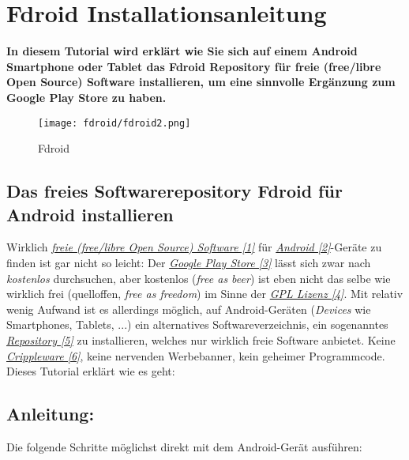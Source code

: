 \section*{Fdroid Installationsanleitung}
\hypertarget{fdroid}{}
\label{fdroid}

\textbf{In diesem Tutorial wird erklärt wie Sie sich auf einem Android Smartphone oder Tablet das Fdroid Repository für freie (free/libre Open Source) Software installieren, um eine sinnvolle Ergänzung zum Google Play Store zu haben.}

\begin{figure}
\texttt{[image: fdroid/fdroid2.png]} \\
\caption{Fdroid}
\end{figure}
\subsection*{Das freies Softwarerepository Fdroid für Android installieren}

Wirklich \href{http://de.wikipedia.org/wiki/Freie_Software}{\textit{freie (free/libre Open Source) Software [1]}} für \href{http://www.android.com/}{\textit{Android [2]}}-Geräte zu finden ist gar nicht so leicht: Der \href{https://play.google.com/store}{\textit{Google Play Store [3]}} lässt sich zwar nach \textit{kostenlos} durchsuchen, aber kostenlos (\textit{free as beer}) ist eben nicht das selbe wie wirklich frei (quelloffen, \textit{free as freedom}) im Sinne der \href{http://de.wikipedia.org/wiki/GNU_General_Public_License}{\textit{GPL Lizenz [4]}}. Mit relativ wenig Aufwand ist es allerdings möglich, auf Android-Geräten (\textit{Devices} wie Smartphones, Tablets, ...) ein alternatives Softwareverzeichnis, ein sogenanntes \href{http://de.wikipedia.org/wiki/Repository}{\textit{Repository [5]}} zu installieren, welches nur wirklich freie Software anbietet. Keine \href{http://de.wikipedia.org/wiki/Crippleware}{\textit{Crippleware [6]}}, keine nervenden Werbebanner, kein geheimer Programmcode. Dieses Tutorial erklärt wie es geht:


\subsection*{Anleitung:}
Die folgende Schritte möglichst direkt mit dem Android-Gerät ausführen:

